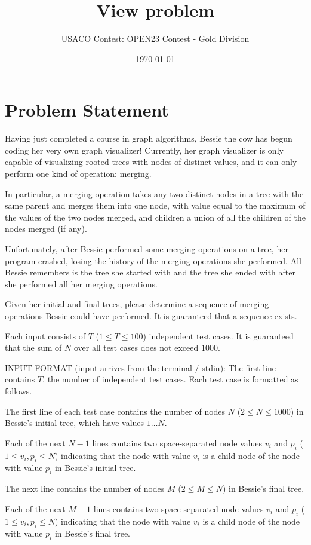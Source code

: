 \documentclass[12pt]{article}
\title{View problem}
\author{USACO Contest: OPEN23 Contest - Gold Division}
\date{\today}
\begin{document}
\maketitle

\section*{Problem Statement}


Having just completed a course in graph algorithms, Bessie the cow has begun
coding her very own graph visualizer! Currently, her graph visualizer is only
capable of visualizing rooted trees with nodes of distinct values, and it can
only perform one kind of operation: merging.

In particular, a merging operation takes any two distinct nodes in a tree with
the same parent and merges them into one node, with value equal to the maximum
of the values of the two nodes merged, and children a union of all the children
of the nodes merged (if any).

Unfortunately, after Bessie performed some merging operations on a tree, her
program crashed, losing the history of the merging operations she performed. All
Bessie remembers is the tree she started with and the tree she ended with after
she performed all her merging operations. 

Given her initial and final trees, please determine a sequence of merging
operations Bessie could have performed. It is guaranteed that a sequence exists.

Each input consists of $T$ ($1\le T\le 100$) independent test cases. It is
guaranteed that the sum of $N$  over all test cases does not exceed $1000$.

INPUT FORMAT (input arrives from the terminal / stdin):
The first line contains $T$, the number of independent test cases. Each test
case is formatted as follows.

The first line of each test case contains the number of nodes $N$
($2 \leq N \leq 1000$) in Bessie's initial tree, which have values $1\dots N$. 

Each of the next $N-1$ lines contains two space-separated node values $v_i$ and
$p_i$ ($1 \leq v_i, p_i \leq N$) indicating that the node with value $v_i$ is a
child node of the node with value $p_i$ in Bessie's initial tree.

The next line contains the number of nodes $M$ ($2 \leq M \leq N$) in Bessie's
final tree. 

Each of the next $M-1$ lines contains two space-separated node values $v_i$ and
$p_i$ ($1 \leq v_i, p_i \leq N$) indicating that the node with value $v_i$ is a
child node of the node with value $p_i$ in Bessie's final tree.
\end{document}
